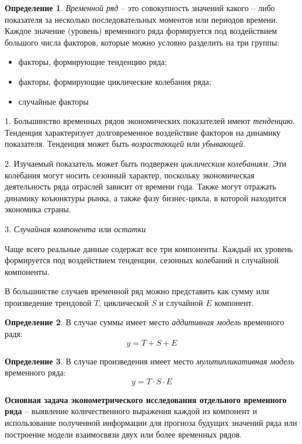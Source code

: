 \documentclass[aps,%
12pt,%
final,%
oneside,
onecolumn,%
musixtex, %
superscriptaddress,%
centertags]{article} %
\theoremstyle{plain}
\theoremstyle{definition}
\newtheorem{definition}{Определение}[subsection]
\theoremstyle{remark}
\begin{document}
\begin{definition}
	\textit{Временной ряд} – это совокупность значений какого – либо показателя за несколько последовательных моментов или периодов времени. Каждое значение (уровень) временного ряда формируется под воздействием большого числа факторов, которые можно условно разделить на три группы:
	\begin{itemize}
		\item факторы, формирующие тенденцию ряда;
		\item факторы, формирующие циклические колебания ряда;
		\item случайные факторы
	\end{itemize}

\end{definition}

1. Большинство временных рядов экономических показателей имеют \textit{тенденцию}. Тенденция характеризует долговременное воздействие факторов на динамику показателя. Тенденция может быть \textit{возрастающей} или \textit{убывающей}.

2. Изучаемый показатель может быть подвержен \textit{циклическим колебаниям.} Эти колебания могут носить сезонный характер, поскольку экономическая деятельность ряда отраслей зависит от времени года. Также могут отражать динамику коъюнктуры рынка, а также фазу бизнес-цикла, в которой находится экономика страны.

3. \textit{Случайная компонента} или \textit{остатки}

Чаще всего реальные данные содержат все три компоненты. Каждый их уровень формируется под воздействием тенденции, сезонных колебаний и случайной компоненты.

В большинстве случаев временной ряд можно представить как сумму или произведение трендовой $T$, циклической $S$ и случайной $E$ компонент. 

\begin{definition}
	В случае суммы имеет место \textit{аддитивная модель} временного радя:
	$$y = T + S + E$$
\end{definition}

\begin{definition}
	В случае произведения имеет место \textit{мультипликативная модель} временного ряда:
	$$y = T \cdot S \cdot E$$
\end{definition}

\textbf{Основная задача эконометрического исследования отдельного временного ряда} – выявление количественного выражения каждой из компонент и использование полученной информации для прогноза будущих значений ряда или построение модели взаимосвязи двух или более временных рядов.
\end{document}
